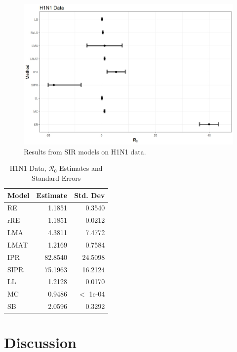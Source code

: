\documentclass[12pt]{article}
\newcommand{\rr}{\ensuremath{\mathcal{R}_0}}
\begin{document}
\begin{figure}[H]
	\centering
	\includegraphics[width=\textwidth]{images/h1n1.jpeg}
	\caption{Results from SIR models on H1N1 data.}
\end{figure}

\begin{table}[H]
	
	
	\centering
	\begin{tabular}{l|r|r}
		\hline
		Model & Estimate & Std. Dev\\
		\hline
		RE & 1.1851 & 0.3540\\
		\hline
		rRE & 1.1851 & 0.0212\\
		\hline
		LMA & 4.3811 & 7.4772\\
		\hline
		LMAT & 1.2169 & 0.7584\\
		\hline
		IPR & 82.8540 & 24.5098\\
		\hline
		SIPR & 75.1963 & 16.2124\\
		\hline
		LL & 1.2128 & 0.0170\\
		\hline
		MC & 0.9486 & $<$ 1e-04 \\
		\hline
		SB & 2.0596 & 0.3292\\
		\hline
	\end{tabular}
	\caption{H1N1 Data, $\rr$ Estimates and Standard Errors}
\end{table}


      
\section{Discussion}\label{sec:discussion}

\end{document}
